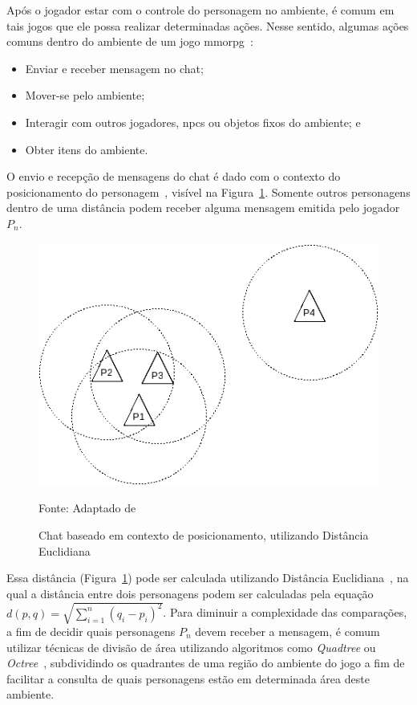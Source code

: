 Após o jogador estar com o controle do personagem no ambiente, é comum em tais jogos que ele possa realizar determinadas ações.
%
Nesse sentido, algumas ações comuns dentro do ambiente de um jogo \ac{mmorpg}~\cite{mmorpg_culture}:

\begin{itemize}
  \item Enviar e receber mensagem no chat;
  \item Mover-se pelo ambiente;
  \item Interagir com outros jogadores, \acp{npc} ou objetos fixos do ambiente; e
  \item Obter itens do ambiente.
\end{itemize}



O envio e recepção de mensagens do chat é dado com o contexto do posicionamento do personagem~\cite{albion_online_unite}, visível na Figura~\ref{fig:chat}.
%
Somente outros personagens dentro de uma distância podem receber alguma mensagem emitida pelo jogador $P_n$.

\begin{figure}[htb!]
\caption{Chat baseado em contexto de posicionamento, utilizando Distância Euclidiana}
\label{fig:chat}
\includegraphics[height=8cm]{img/cap2/chat.png}
\centering

Fonte: Adaptado de ~\cite{albion_online_unite}
\end{figure}

Essa distância (Figura~\ref{fig:chat}) pode ser calculada utilizando Distância Euclidiana~\cite{Deza2009Aug}, na qual a distância entre dois personagens podem ser calculadas pela equação $d(p, q) = \sqrt{\sum_{i=1}^{n}(q_i - p_i)^2}$.
%
Para diminuir a complexidade das comparações, a fim de decidir quais personagens $P_n$ devem receber a mensagem, é comum utilizar técnicas de divisão de área utilizando algoritmos como \textit{Quadtree} ou \textit{Octree}~\cite{Lengyel2011Jun}, subdividindo os quadrantes de uma região do ambiente do jogo a fim de facilitar a consulta de quais personagens estão em determinada área deste ambiente.


